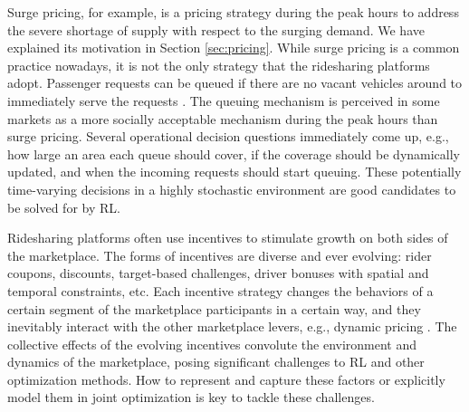 \documentclass{article}
\begin{document}
Surge pricing, for example, is a pricing strategy during the peak hours to address the severe shortage of supply with respect to the surging demand. We have explained its motivation in Section \ref{sec:pricing}. While surge pricing is a common practice nowadays, it is not the only strategy that the ridesharing platforms adopt. Passenger requests can be queued if there are no vacant vehicles around to immediately serve the requests \citep{zhong2020queueing}. 
The queuing mechanism is perceived in some markets as a more socially acceptable mechanism during the peak hours than surge pricing. Several operational decision questions immediately come up, e.g., how large an area each queue should cover, if the coverage should be dynamically updated, and when the incoming requests should start queuing. These potentially time-varying decisions in a highly stochastic environment are good candidates to be solved for by RL.

Ridesharing platforms often use incentives to stimulate growth on both sides of the marketplace. The forms of incentives are diverse and ever evolving: rider coupons, discounts, target-based challenges, driver bonuses with spatial and temporal constraints, etc. Each incentive strategy changes the behaviors of a certain segment of the marketplace participants in a certain way, and they inevitably interact with the other marketplace levers, e.g., dynamic pricing \citep{yang2020integrated}. The collective effects of the evolving incentives convolute the environment and dynamics of the marketplace, posing significant challenges to RL and other optimization methods. How to represent and capture these factors or explicitly model them in joint optimization is key to tackle these challenges.
\end{document}
